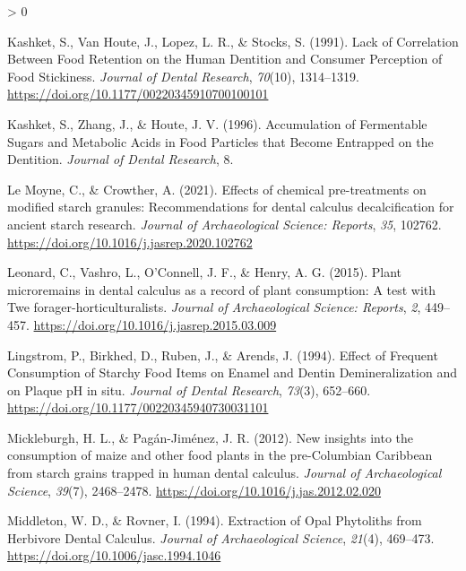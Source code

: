 \documentclass[
]{article}
\newlength{\cslhangindent}
\newenvironment{CSLReferences}[2] %
 {%
  \setlength{\parindent}{0pt}
  \ifodd #1 \everypar{\setlength{\hangindent}{\cslhangindent}}\ignorespaces\fi
  \ifnum #2 > 0
  \setlength{\parskip}{#2\baselineskip}
  \fi
 }%
 {}
\begin{document}
\begin{CSLReferences}{1}{0}
\leavevmode\hypertarget{ref-kashketFoodRetention1991}{}%
Kashket, S., Van Houte, J., Lopez, L. R., \& Stocks, S. (1991). Lack of {Correlation Between Food Retention} on the {Human Dentition} and {Consumer Perception} of {Food Stickiness}. \emph{Journal of Dental Research}, \emph{70}(10), 1314--1319. \url{https://doi.org/10.1177/00220345910700100101}

\leavevmode\hypertarget{ref-kashketFoodParticles1996}{}%
Kashket, S., Zhang, J., \& Houte, J. V. (1996). Accumulation of {Fermentable Sugars} and {Metabolic Acids} in {Food Particles} that {Become Entrapped} on the {Dentition}. \emph{Journal of Dental Research}, 8.

\leavevmode\hypertarget{ref-lemoyneCalculusPretreatments2021}{}%
Le Moyne, C., \& Crowther, A. (2021). Effects of chemical pre-treatments on modified starch granules: {Recommendations} for dental calculus decalcification for ancient starch research. \emph{Journal of Archaeological Science: Reports}, \emph{35}, 102762. \url{https://doi.org/10.1016/j.jasrep.2020.102762}

\leavevmode\hypertarget{ref-leonardDentalCalculus2015}{}%
Leonard, C., Vashro, L., O'Connell, J. F., \& Henry, A. G. (2015). Plant microremains in dental calculus as a record of plant consumption: {A} test with {Twe} forager-horticulturalists. \emph{Journal of Archaeological Science: Reports}, \emph{2}, 449--457. \url{https://doi.org/10.1016/j.jasrep.2015.03.009}

\leavevmode\hypertarget{ref-lingstromStarchyFood1994}{}%
Lingstrom, P., Birkhed, D., Ruben, J., \& Arends, J. (1994). Effect of {Frequent Consumption} of {Starchy Food Items} on {Enamel} and {Dentin Demineralization} and on {Plaque pH} in situ. \emph{Journal of Dental Research}, \emph{73}(3), 652--660. \url{https://doi.org/10.1177/00220345940730031101}

\leavevmode\hypertarget{ref-mickleburghNewInsightsConsumption2012}{}%
Mickleburgh, H. L., \& Pagán-Jiménez, J. R. (2012). New insights into the consumption of maize and other food plants in the pre-{Columbian Caribbean} from starch grains trapped in human dental calculus. \emph{Journal of Archaeological Science}, \emph{39}(7), 2468--2478. \url{https://doi.org/10.1016/j.jas.2012.02.020}

\leavevmode\hypertarget{ref-middletonExtractionOpalPhytoliths1994}{}%
Middleton, W. D., \& Rovner, I. (1994). Extraction of {Opal Phytoliths} from {Herbivore Dental Calculus}. \emph{Journal of Archaeological Science}, \emph{21}(4), 469--473. \url{https://doi.org/10.1006/jasc.1994.1046}


\end{CSLReferences}
\end{document}
